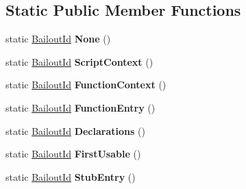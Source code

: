 \subsection*{Static Public Member Functions}
\begin{DoxyCompactItemize}
\item 
static \hyperlink{classv8_1_1internal_1_1_bailout_id}{Bailout\+Id} {\bfseries None} ()\hypertarget{classv8_1_1internal_1_1_bailout_id_ae28ec2edaa82bbe4857e4e56e709ab33}{}\label{classv8_1_1internal_1_1_bailout_id_ae28ec2edaa82bbe4857e4e56e709ab33}

\item 
static \hyperlink{classv8_1_1internal_1_1_bailout_id}{Bailout\+Id} {\bfseries Script\+Context} ()\hypertarget{classv8_1_1internal_1_1_bailout_id_ae0210bdeb6562467228bcf31f5a5ee99}{}\label{classv8_1_1internal_1_1_bailout_id_ae0210bdeb6562467228bcf31f5a5ee99}

\item 
static \hyperlink{classv8_1_1internal_1_1_bailout_id}{Bailout\+Id} {\bfseries Function\+Context} ()\hypertarget{classv8_1_1internal_1_1_bailout_id_abedbdfc7ea37468549027b67b3a8ef88}{}\label{classv8_1_1internal_1_1_bailout_id_abedbdfc7ea37468549027b67b3a8ef88}

\item 
static \hyperlink{classv8_1_1internal_1_1_bailout_id}{Bailout\+Id} {\bfseries Function\+Entry} ()\hypertarget{classv8_1_1internal_1_1_bailout_id_a92ecb683edac7021e0430f3800aab6e1}{}\label{classv8_1_1internal_1_1_bailout_id_a92ecb683edac7021e0430f3800aab6e1}

\item 
static \hyperlink{classv8_1_1internal_1_1_bailout_id}{Bailout\+Id} {\bfseries Declarations} ()\hypertarget{classv8_1_1internal_1_1_bailout_id_a3cf70d09c511d9d723b08f7786b1c897}{}\label{classv8_1_1internal_1_1_bailout_id_a3cf70d09c511d9d723b08f7786b1c897}

\item 
static \hyperlink{classv8_1_1internal_1_1_bailout_id}{Bailout\+Id} {\bfseries First\+Usable} ()\hypertarget{classv8_1_1internal_1_1_bailout_id_a7fe9eca0a53d668361894dadd7a5f29b}{}\label{classv8_1_1internal_1_1_bailout_id_a7fe9eca0a53d668361894dadd7a5f29b}

\item 
static \hyperlink{classv8_1_1internal_1_1_bailout_id}{Bailout\+Id} {\bfseries Stub\+Entry} ()\hypertarget{classv8_1_1internal_1_1_bailout_id_a40e64c2d4e63153746fe3f1ae62ebc59}{}\label{classv8_1_1internal_1_1_bailout_id_a40e64c2d4e63153746fe3f1ae62ebc59}

\end{DoxyCompactItemize}
